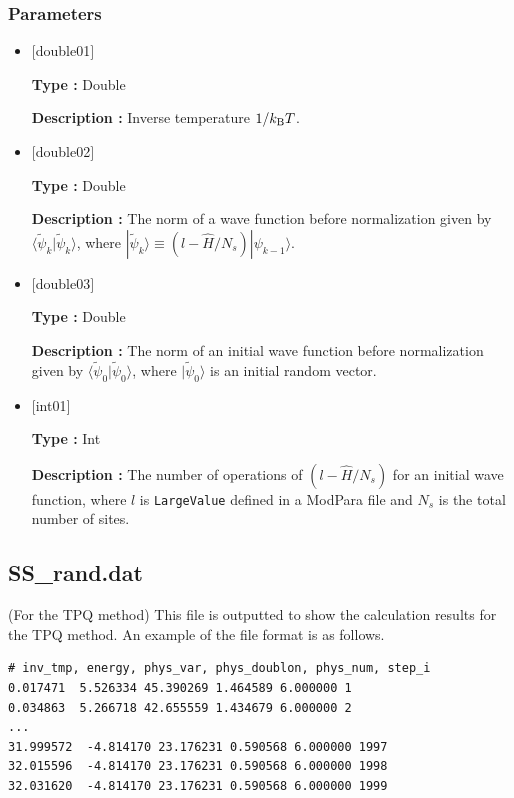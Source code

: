 \subsubsection{Parameters}
 \begin{itemize}

  \item  $[$double01$]$
  
 {\bf Type :} Double

{\bf Description :}  Inverse temperature $1/{k_{\rm B}T}$.
 
  \item $[$double02$]$

 {\bf Type :} Double 

{\bf Description :}  The norm of a wave function before normalization 
given by $\langle \tilde{\psi}_{k} |\tilde{\psi}_{k}\rangle$, where $|\tilde{\psi}_{k}\rangle \equiv(l-\hat{H}/N_{s})|\psi_{k-1}\rangle$.


  \item $[$double03$]$

 {\bf Type :} Double 

{\bf Description :} The norm of an initial wave function before normalization 
given by $\langle \tilde{\psi}_{0} |\tilde{\psi}_{0}\rangle$, where $|\tilde{\psi}_{0}\rangle$ is an initial random vector.

  \item $[$int01$]$

 {\bf Type :} Int 

{\bf Description :} The number of operations of $(l-\hat{H}/N_{s})$ for an initial wave function, where $l$ is \verb|LargeValue| defined in a ModPara file and $N_{s}$ is the total number of sites.

 \end{itemize}

\newpage
\subsection{SS\_rand.dat}
\label{Subsec:ssrand}
(For the TPQ method) This file is outputted to show the calculation results for the TPQ method.
An example of the file format is as follows.\\
\begin{minipage}{15cm}
\begin{screen}
\begin{verbatim}
# inv_tmp, energy, phys_var, phys_doublon, phys_num, step_i
0.017471  5.526334 45.390269 1.464589 6.000000 1
0.034863  5.266718 42.655559 1.434679 6.000000 2
...
31.999572  -4.814170 23.176231 0.590568 6.000000 1997
32.015596  -4.814170 23.176231 0.590568 6.000000 1998
32.031620  -4.814170 23.176231 0.590568 6.000000 1999
\end{verbatim}
\end{screen}
\end{minipage}

